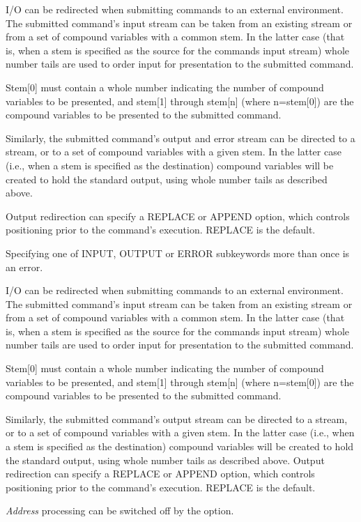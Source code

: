I/O can be redirected when submitting commands to an external
environment. The submitted command's input stream can be taken from an
existing stream or from a set of compound variables with a common
stem. In the latter case (that is, when a stem is specified as the
source for the commands input stream) whole number tails are used to
order input for presentation to the submitted command.

Stem[0] must contain a whole number indicating the number of compound variables to be presented, and stem[1] through stem[n] (where n=stem[0]) are the compound variables to be presented to the submitted command.

Similarly, the submitted command's output and error stream can be directed to a stream, or to a set of compound variables with a given stem. In the latter case (i.e., when a stem is specified as the destination) compound variables will be created to hold the standard output, using whole number tails as described above. 

Output redirection can specify a REPLACE or APPEND option, which controls positioning prior to the command's execution. REPLACE is the default.

Specifying one of INPUT, OUTPUT or ERROR subkeywords more than once is an error.

I/O can be redirected when submitting commands to an external
environment. The submitted command's input stream can be taken from an
existing stream or from a set of compound variables with a common
stem. In the latter case (that is, when a stem is specified as the
source for the commands input stream) whole number tails are used to
order input for presentation to the submitted command.

Stem[0] must contain a whole number indicating the number of compound variables to be presented, and stem[1] through stem[n] (where n=stem[0]) are the compound variables to be presented to the submitted command.

Similarly, the submitted command's output stream can be directed to a stream, or to a set of compound variables with a given stem. In the latter case (i.e., when a stem is specified as the destination) compound variables will be created to hold the standard output, using whole number tails as described above. Output redirection can specify a REPLACE or APPEND option, which controls positioning prior to the command's execution. REPLACE is the default.

\emph{Address} processing can be switched off by the  option.

